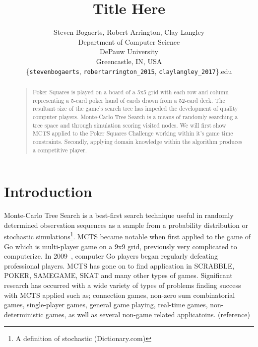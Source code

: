 \documentclass[letterpaper]{article}
\begin{document}
%
\title{Title Here}    %
\author{Steven Bogaerts, Robert Arrington, Clay Langley\\
Department of Computer Science\\
DePauw University\\
Greencastle, IN, USA\\
\{{\tt stevenbogaerts}, {\tt robertarrington\_2015}, {\tt claylangley\_2017}\}{\tt@depauw.edu}
}
\maketitle
\begin{abstract}
\begin{quote}
Poker Squares is played on a board of a 5x5 grid with each row and column representing a 5-card poker hand of cards drawn from a 52-card deck. The resultant size of the game's search tree has impeded the development of quality computer players. Monte-Carlo Tree Search is a means of randomly searching a tree space and through simulation scoring visited nodes. We will first show MCTS applied to the Poker Squares Challenge working within it's game time constraints. Secondly, applying domain knowledge within the algorithm produces a competitive player.
\end{quote}
\end{abstract}

\section{Introduction}
Monte-Carlo Tree Search is a best-first search technique useful in randomly determined observation sequences as a sample from a probability distribution or stochastic simulations\footnote{A definition of stochastic (Dictionary.com)}. MCTS became notable when first applied to the game of Go which is multi-player game on a 9x9 grid, previously very complicated to computerize. In 2009~\cite{chaslot2008monte}, computer Go players began regularly defeating professional players. MCTS has gone on to find application in SCRABBLE, POKER, SAMEGAME, SKAT and many other types of games. Significant research has occurred with a wide variety of types of problems finding success with MCTS applied such as; connection games, non-zero sum combinatorial games, single-player games, general game playing, real-time games, non-deterministic games, as well as several non-game related applicatoins. (reference)
\end{document}
